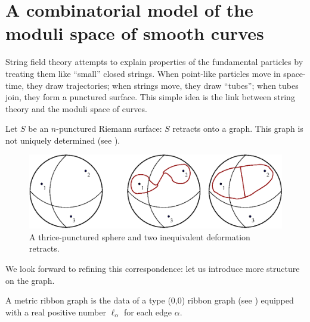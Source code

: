 \section{A combinatorial model of the moduli space of smooth curves}
\label{sec:mgn-comb}

String field theory attempts to explain properties of the fundamental
particles by treating them like ``small'' closed strings. When
point-like particles move in space-time, they draw trajectories; when
strings move, they draw ``tubes''; when tubes join, they form a
punctured surface. This simple idea is the link between string theory
and the moduli space of curves. 

Let $S$ be an $n$-punctured Riemann surface: $S$ retracts onto a
graph. This graph is not uniquely determined (see
).
\begin{figure}[bt]
  \centering\includegraphics[width=\textwidth]{sfera3}
  \caption{A thrice-punctured sphere and two inequivalent
    deformation retracts.} 
  \label{fig:sphere-retracts}
\end{figure}
We look forward to refining this correspondence: let us introduce more
structure on the graph.
\begin{definition}
  \label{dfn:metric-ribbon-graphs}
  A metric ribbon graph is the data of a type (0,0) ribbon graph (see
  ) equipped with a real positive number
  $\ell_\alpha$ for each edge $\alpha$.
\end{definition}

